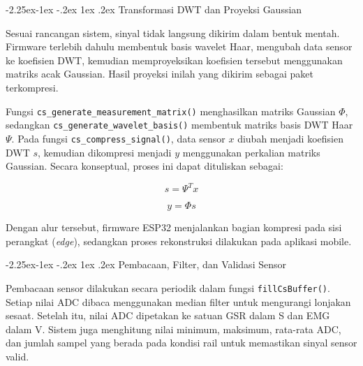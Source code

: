 \documentclass[12pt,a4paper]{report}
\makeatletter
\renewcommand{\subsection}{\@startsection{subsection}{2}{\z@}%
  {-2.25ex\@plus -1ex \@minus -.2ex}%
  {1ex \@plus .2ex}%
  {\normalfont\bfseries\fontsize{12}{14}\selectfont}}
\makeatother
\begin{document}
\subsection{Transformasi DWT dan Proyeksi Gaussian}

Sesuai rancangan sistem, sinyal tidak langsung dikirim dalam bentuk mentah. Firmware
terlebih dahulu membentuk basis wavelet Haar, mengubah data sensor ke koefisien DWT,
kemudian memproyeksikan koefisien tersebut menggunakan matriks acak Gaussian. Hasil
proyeksi inilah yang dikirim sebagai paket terkompresi.





Fungsi \texttt{cs\_generate\_measurement\_matrix()} menghasilkan matriks Gaussian
\(\Phi\), sedangkan \texttt{cs\_generate\_wavelet\_basis()} membentuk matriks basis
DWT Haar \(\Psi\). Pada fungsi \texttt{cs\_compress\_signal()}, data sensor \(x\)
diubah menjadi koefisien DWT \(s\), kemudian dikompresi menjadi \(y\) menggunakan
perkalian matriks Gaussian. Secara konseptual, proses ini dapat dituliskan sebagai:

\[
s = \Psi^T x
\]

\[
y = \Phi s
\]

Dengan alur tersebut, firmware ESP32 menjalankan bagian kompresi pada sisi perangkat
(\textit{edge}), sedangkan proses rekonstruksi dilakukan pada aplikasi mobile.

\subsection{Pembacaan, Filter, dan Validasi Sensor}

Pembacaan sensor dilakukan secara periodik dalam fungsi \texttt{fillCsBuffer()}. Setiap
nilai ADC dibaca menggunakan median filter untuk mengurangi lonjakan sesaat. Setelah itu,
nilai ADC dipetakan ke satuan GSR dalam \textmu S dan EMG dalam \textmu V. Sistem juga
menghitung nilai minimum, maksimum, rata-rata ADC, dan jumlah sampel yang berada pada
kondisi rail untuk memastikan sinyal sensor valid.


\end{document}
